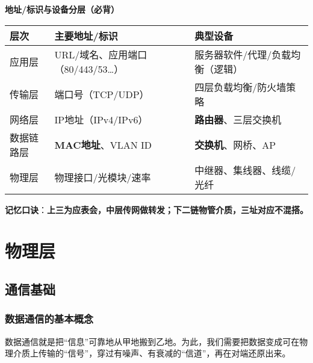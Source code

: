 \documentclass[lang=cn,newtx,10pt,scheme=chinese]{../../elegantbook}
\begin{document}
	\textbf{地址/标识与设备分层（必背）}

\begin{longtable}{|p{3.2cm}|p{5.6cm}|p{4.7cm}|}
\hline
	\textbf{层次} & \textbf{主要地址/标识} & \textbf{典型设备} \\
\hline
应用层 & URL/域名、应用端口（80/443/53…） & 服务器软件/代理/负载均衡（逻辑） \\
\hline
传输层 & 端口号（TCP/UDP） & 四层负载均衡/防火墙策略 \\
\hline
网络层 & IP地址（IPv4/IPv6） & \textbf{路由器}、三层交换机 \\
\hline
数据链路层 & \textbf{MAC地址}、VLAN ID & \textbf{交换机}、网桥、AP \\
\hline
物理层 & 物理接口/光模块/速率 & 中继器、集线器、线缆/光纤 \\
\hline
\end{longtable}
\begin{center}
\end{center}

	\textbf{记忆口诀}：\textbf{上三为应表会，中层传网做转发；下二链物管介质，三址对应不混搭。}

\chapter{物理层}

\section{通信基础}
\subsection{数据通信的基本概念}
数据通信就是把“信息”可靠地从甲地搬到乙地。为此，我们需要把数据变成可在物理介质上传输的“信号”，穿过有噪声、有衰减的“信道”，再在对端还原出来。
\end{document}
